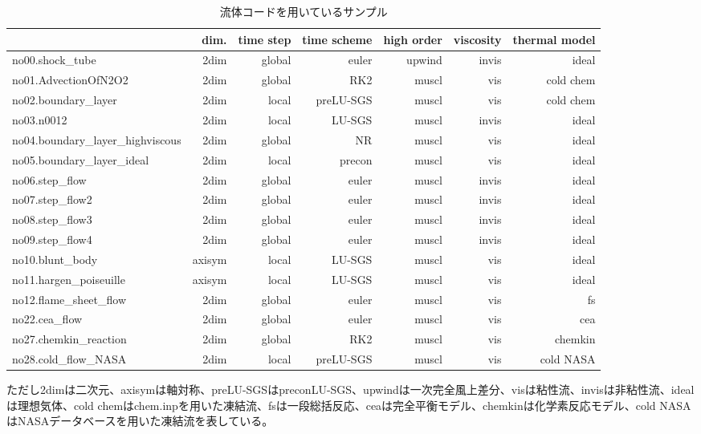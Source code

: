 \documentclass{jsarticle}
\begin{document}
\begin{table}[b]%
\centering
\caption{流体コードを用いているサンプル}
\begin{tabular}{lrrrrrr}
 & dim. & time step & time scheme & high order & viscosity & thermal model\\
\hline
no00.shock\_tube                  & 2dim   & global & euler     & upwind & invis & ideal \\
no01.AdvectionOfN2O2              & 2dim   & global & RK2       & muscl  & vis   & cold chem \\
no02.boundary\_layer              & 2dim   & local  & preLU-SGS & muscl  & vis   & cold chem \\
no03.n0012                        & 2dim   & local  & LU-SGS    & muscl  & invis & ideal \\
no04.boundary\_layer\_highviscous & 2dim   & global & NR        & muscl  & vis   & ideal \\
no05.boundary\_layer\_ideal       & 2dim   & local  & precon    & muscl  & vis   & ideal \\
no06.step\_flow                   & 2dim   & global & euler     & muscl  & invis & ideal \\
no07.step\_flow2                  & 2dim   & global & euler     & muscl  & invis & ideal \\
no08.step\_flow3                  & 2dim   & global & euler     & muscl  & invis & ideal \\
no09.step\_flow4                  & 2dim   & global & euler     & muscl  & invis & ideal \\
no10.blunt\_body                  & axisym & local  & LU-SGS    & muscl  & vis   & ideal \\
no11.hargen\_poiseuille           & axisym & local  & LU-SGS    & muscl  & vis   & ideal \\
no12.flame\_sheet\_flow           & 2dim   & global & euler     & muscl  & vis   & fs \\
no22.cea\_flow                    & 2dim   & global & euler     & muscl  & vis   & cea \\
no27.chemkin\_reaction            & 2dim   & global & RK2       & muscl  & vis   & chemkin \\
no28.cold\_flow\_NASA             & 2dim   & local  & preLU-SGS & muscl  & vis   & cold NASA \\
\hline
\end{tabular}
\flushleft
ただし2dimは二次元、axisymは軸対称、preLU-SGSはpreconLU-SGS、upwindは一次完全風上差分、visは粘性流、invisは非粘性流、idealは理想気体、cold chemはchem.inpを用いた凍結流、fsは一段総括反応、ceaは完全平衡モデル、chemkinは化学素反応モデル、cold NASAはNASAデータベースを用いた凍結流を表している。
\end{table}
\end{document}
